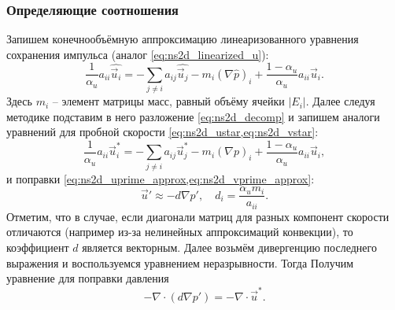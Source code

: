 \subsubsection{Определяющие соотношения}
Запишем конечнообъёмную аппроксимацию линеаризованного уравнения сохранения импульса (аналог \cref{eq:ns2d_linearized_u}):
\begin{equation}
\label{eq:ns2d_fvmsimple_momentum}
\frac{1}{\alpha_u} a_{ii}\hat{\vec u_i} = -\sum_{j\neq i} a_{ij} \hat{\vec u_j} - m_i \left(\nabla \hat p\right)_i + \frac{1 - \alpha_u}{\alpha_u} a_{ii} \vec u_i.
\end{equation}
Здесь $m_i$ -- элемент матрицы масс, равный объёму ячейки $|E_i|$.
Далее следуя методике 
подставим в него разложение \cref{eq:ns2d_decomp}
и запишем аналоги уравнений для пробной скорости \cref{eq:ns2d_ustar,eq:ns2d_vstar}:
\begin{equation}
\label{eq:ns2d_fvm_ustar}
\frac{1}{\alpha_u} a_{ii} \vec u^*_i = -\sum_{j\neq i} a_{ij} \vec u^*_j - m_i (\nabla p)_i + \frac{1 - \alpha_u}{\alpha_u} a_{ii} \vec u_i,
\end{equation}
и поправки \cref{eq:ns2d_uprime_approx,eq:ns2d_vprime_approx}:
\begin{equation}
\label{eq:ns2d_fvm_uprime}
\vec u' \approx - d \nabla{p'}, \quad d_i = \frac{\alpha_u m_i}{a_{ii}}.
\end{equation}
Отметим, что в случае, если диагонали матриц для
разных компонент скорости отличаются (например из-за нелинейных аппроксимаций конвекции),
то коэффициент $d$ является векторным.
Далее возьмём дивергенцию последнего выражения и воспользуемся уравнением неразрывности. Тогда
Получим уравнение для поправки давления
\begin{equation}
\label{eq:ns2d_fvm_prime}
-\nabla\cdot \left( d \nabla{p'}\right) = -\nabla \cdot \vec u^*.
\end{equation}

